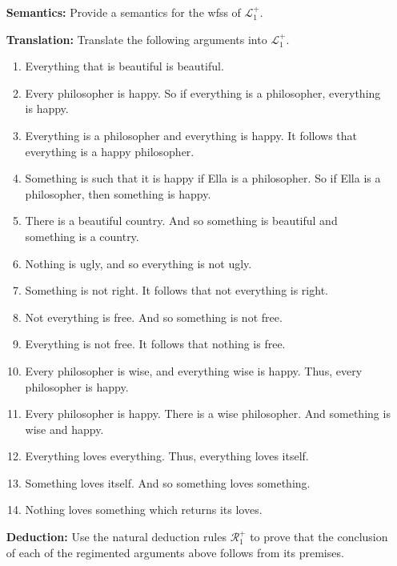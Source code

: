 \documentclass[a4paper, 11pt]{article} %
\begin{document}
\begin{enumerate}[leftmargin=1.2in,labelsep=.15in] 
\item[\bf Semantics:] Provide a semantics for the wfss of $\mathcal{L}^+_1$.
\item[\bf Translation:] Translate the following arguments into $\mathcal{L}_1^+$.
	\begin{enumerate}[label=(\arabic*)]\small
	\item Everything that is beautiful is beautiful.
	\item Every philosopher is happy. So if everything is a philosopher, everything is happy.
	\item Everything is a philosopher and everything is happy. It follows that everything is a happy philosopher.
	\item Something is such that it is happy if Ella is a philosopher. So if Ella is a philosopher, then something is happy. 
	\item There is a beautiful country. And so something is beautiful and something is a country.
	\item Nothing is ugly, and so everything is not ugly.
	\item Something is not right. It follows that not everything is right.
	\item Not everything is free. And so something is not free.
	\item Everything is not free. It follows that nothing is free.
	\item Every philosopher is wise, and everything wise is happy. Thus, every philosopher is happy.
	\item Every philosopher is happy. There is a wise philosopher. And something is wise and happy.
	\item Everything loves everything. Thus, everything loves itself.
	\item Something loves itself. And so something loves something.
	\item Nothing loves something which returns its loves.
	\end{enumerate}
\item[\bf Deduction:] Use the natural deduction rules $\mathcal{R}_1^+$ to prove that the conclusion of each of the regimented arguments above follows from its premises.

\end{enumerate}
\end{document}
